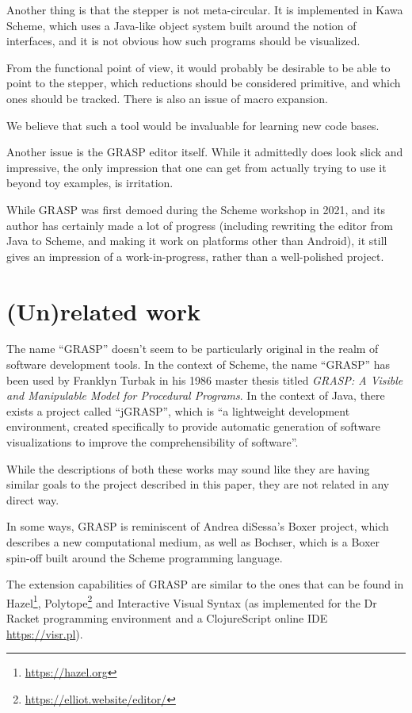\documentclass[acmsmall]{acmart}
\begin{document}
Another thing is that the stepper is not meta-circular. It is
implemented in Kawa Scheme, which uses a Java-like object system built
around the notion of interfaces, and it is not obvious how such
programs should be visualized.

From the functional point of view, it would probably be desirable to be
able to point to the stepper, which reductions should be considered
primitive, and which ones should be tracked. There is also an issue
of macro expansion.

We believe that such a tool would be invaluable for learning new
code bases.

Another issue is the GRASP editor itself. While it admittedly does
look slick and impressive, the only impression that one can get from
actually trying to use it beyond toy examples, is irritation.

While GRASP was first demoed during the Scheme workshop in
2021\cite{Godek2021}, and its author has certainly made a lot of
progress (including rewriting the editor from Java to Scheme, and
making it work on platforms other than Android), it still gives an
impression of a work-in-progress, rather than a well-polished project.

\section{(Un)related work}

The name ``GRASP'' doesn't seem to be particularly original in the
realm of software development tools. In the context of Scheme, the
name ``GRASP'' has been used by Franklyn Turbak in his 1986 master
thesis titled \textit{GRASP: A Visible and Manipulable Model for
  Procedural Programs}\cite{Turbak}. In the context of Java, there
exists a project called ``jGRASP'', which is ``a lightweight
development environment, created specifically to provide automatic
generation of software visualizations to improve the comprehensibility
of software''\cite{jGRASP}.

While the descriptions of both these works may sound like they are
having similar goals to the project described in this paper, they are
not related in any direct way.

In some ways, GRASP is reminiscent of Andrea diSessa's Boxer
project\cite{Boxer}, which describes a new computational medium, as
well as Bochser\cite{Bochser}, which is a Boxer spin-off built around
the Scheme programming language.

The extension capabilities of GRASP are similar to the ones that can
be found in Hazel\footnote{\url{https://hazel.org}},
Polytope\footnote{\url{https://elliot.website/editor/}} and
Interactive Visual Syntax (as implemented for the Dr Racket
programming environment and a ClojureScript online IDE
\url{https://visr.pl})\cite{Andersen}.
\end{document}
